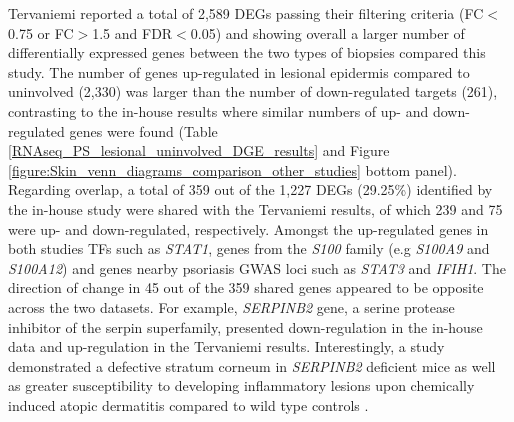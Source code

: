 Tervaniemi reported a total of 2,589 DEGs passing their filtering criteria (FC$<$0.75 or FC$>$1.5 and FDR$<$0.05) and showing overall a larger number of differentially expressed genes between the two types of biopsies compared this study. The number of genes up-regulated in lesional epidermis compared to uninvolved (2,330) was larger than the number of down-regulated targets (261), contrasting to the in-house results where similar numbers of up- and down-regulated genes were found (Table \ref{RNAseq_PS_lesional_uninvolved_DGE_results} and Figure \ref{figure:Skin_venn_diagrams_comparison_other_studies} bottom panel). Regarding overlap, a total of 359 out of the 1,227 DEGs (29.25\%) identified by the in-house study were shared with the Tervaniemi results, of which 239 and 75 were up- and down-regulated, respectively. Amongst the up-regulated genes in both studies TFs such as \textit{STAT1}, genes from the \textit{S100} family (e.g \textit{S100A9} and \textit{S100A12}) and genes nearby psoriasis GWAS loci such as \textit{STAT3} and \textit{IFIH1}. The direction of change in 45 out of the 359 shared genes appeared to be opposite across the two datasets. For example, \textit{SERPINB2} gene, a serine protease inhibitor of the serpin superfamily, presented down-regulation in the in-house data and up-regulation in the Tervaniemi results. Interestingly, a study demonstrated a defective stratum corneum in \textit{SERPINB2} deficient mice as well as greater susceptibility to developing inflammatory lesions upon chemically induced atopic dermatitis compared to wild type controls \parencite{Schroder2016}. 




